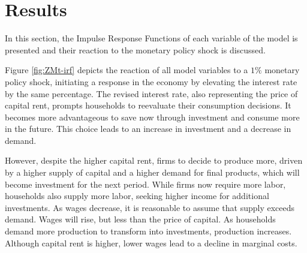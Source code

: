 \documentclass[../thesis.tex]{subfiles}
\begin{document}
	\newpage

	\section{Results}\label{sec:results}	

	In this section, the Impulse Response Functions of each variable of the model is presented and their reaction to the monetary policy shock is discussed.
	
	
	Figure \eqref{fig:ZMt-irf} depicts the reaction of all model variables to a $1\%$ monetary policy shock, initiating a response in the economy by elevating the interest rate by the same percentage. The revised interest rate, also representing the price of capital rent, prompts households to reevaluate their consumption decisions. It becomes more advantageous to save now through investment and consume more in the future. This choice leads to an increase in investment and a decrease in demand.
	
	However, despite the higher capital rent, firms to decide to produce more, driven by a higher supply of capital and a higher demand for final products, which will become investment for the next period. While firms now require more labor, households also supply more labor, seeking higher income for additional investments. As wages decrease, it is reasonable to assume that supply exceeds demand. Wages will rise, but less than the price of capital. As households demand more production to transform into investments, production increases. Although capital rent is higher, lower wages lead to a decline in marginal costs.
	
\end{document}
